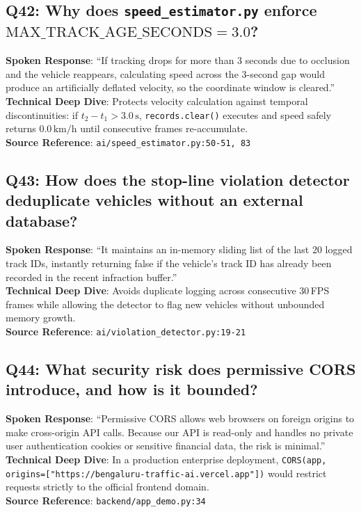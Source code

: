 \documentclass[11pt,a4paper,oneside]{report}
\begin{document}
\subsection*{Q42: Why does \texttt{speed\_estimator.py} enforce $\text{MAX\_TRACK\_AGE\_SECONDS} = 3.0$?}
\begin{interviewbox}
\textbf{Spoken Response}: ``If tracking drops for more than 3 seconds due to occlusion and the vehicle reappears, calculating speed across the 3-second gap would produce an artificially deflated velocity, so the coordinate window is cleared.''\\
\textbf{Technical Deep Dive}: Protects velocity calculation against temporal discontinuities: if $t_2 - t_1 > 3.0\,\text{s}$, \texttt{records.clear()} executes and speed safely returns $0.0\,\text{km/h}$ until consecutive frames re-accumulate.\\
\textbf{Source Reference}: \texttt{ai/speed\_estimator.py:50-51, 83}
\end{interviewbox}

\subsection*{Q43: How does the stop-line violation detector deduplicate vehicles without an external database?}
\begin{interviewbox}
\textbf{Spoken Response}: ``It maintains an in-memory sliding list of the last 20 logged track IDs, instantly returning false if the vehicle's track ID has already been recorded in the recent infraction buffer.''\\
\textbf{Technical Deep Dive}: Avoids duplicate logging across consecutive 30\,FPS frames while allowing the detector to flag new vehicles without unbounded memory growth.\\
\textbf{Source Reference}: \texttt{ai/violation\_detector.py:19-21}
\end{interviewbox}

\subsection*{Q44: What security risk does permissive CORS introduce, and how is it bounded?}
\begin{interviewbox}
\textbf{Spoken Response}: ``Permissive CORS allows web browsers on foreign origins to make cross-origin API calls. Because our API is read-only and handles no private user authentication cookies or sensitive financial data, the risk is minimal.''\\
\textbf{Technical Deep Dive}: In a production enterprise deployment, \texttt{CORS(app, origins=["https://bengaluru-traffic-ai.vercel.app"])} would restrict requests strictly to the official frontend domain.\\
\textbf{Source Reference}: \texttt{backend/app\_demo.py:34}
\end{interviewbox}
\end{document}
